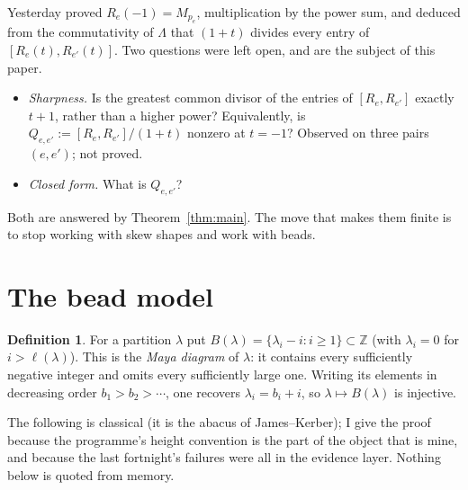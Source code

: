 \documentclass[11pt]{article}
\theoremstyle{definition}
\newtheorem{definition}[theorem]{Definition}
\newcommand{\Lam}{\Lambda}
\newcommand{\Z}{\mathbb{Z}}
\begin{document}
Yesterday proved $R_e(-1)=M_{p_e}$, multiplication by the power sum, and deduced from the
commutativity of $\Lam$ that $(1+t)$ divides every entry of $[R_e(t),R_{e'}(t)]$. Two questions
were left open, and are the subject of this paper.

\begin{itemize}
\item[(S)] \emph{Sharpness.} Is the greatest common divisor of the entries of
$[R_e,R_{e'}]$ exactly $t+1$, rather than a higher power? Equivalently, is
$Q_{e,e'}:=[R_e,R_{e'}]/(1+t)$ nonzero at $t=-1$? Observed on three pairs $(e,e')$; not proved.
\item[(C)] \emph{Closed form.} What is $Q_{e,e'}$?
\end{itemize}

Both are answered by Theorem~\ref{thm:main}. The move that makes them finite is to stop working
with skew shapes and work with beads.

\section{The bead model}\label{sec:abacus}

\begin{definition}\label{def:maya}
For a partition $\lambda$ put $B(\lambda)=\{\lambda_i-i:i\ge1\}\subset\Z$ (with $\lambda_i=0$ for
$i>\ell(\lambda)$). This is the \emph{Maya diagram} of $\lambda$: it contains every sufficiently
negative integer and omits every sufficiently large one. Writing its elements in decreasing order
$b_1>b_2>\cdots$, one recovers $\lambda_i=b_i+i$, so $\lambda\mapsto B(\lambda)$ is injective.
\end{definition}

The following is classical (it is the abacus of James--Kerber); I give the proof because the
programme's height convention is the part of the object that is mine, and because the last
fortnight's failures were all in the evidence layer. Nothing below is quoted from memory.
\end{document}
